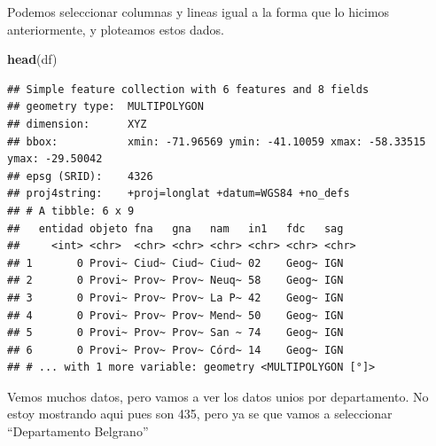 \documentclass[]{book}
\newenvironment{Shaded}{\begin{snugshade}}{\end{snugshade}}
\newcommand{\KeywordTok}[1]{\textcolor[rgb]{0.13,0.29,0.53}{\textbf{#1}}}
\newcommand{\NormalTok}[1]{#1}
\newcommand{\OperatorTok}[1]{\textcolor[rgb]{0.81,0.36,0.00}{\textbf{#1}}}
\begin{document}
Podemos seleccionar columnas y lineas igual a la forma que lo hicimos anteriormente, y ploteamos estos dados.

\begin{Shaded}
\begin{Highlighting}[]
\KeywordTok{head}\NormalTok{(df)}
\end{Highlighting}
\end{Shaded}

\begin{verbatim}
## Simple feature collection with 6 features and 8 fields
## geometry type:  MULTIPOLYGON
## dimension:      XYZ
## bbox:           xmin: -71.96569 ymin: -41.10059 xmax: -58.33515 ymax: -29.50042
## epsg (SRID):    4326
## proj4string:    +proj=longlat +datum=WGS84 +no_defs
## # A tibble: 6 x 9
##   entidad objeto fna   gna   nam   in1   fdc   sag  
##     <int> <chr>  <chr> <chr> <chr> <chr> <chr> <chr>
## 1       0 Provi~ Ciud~ Ciud~ Ciud~ 02    Geog~ IGN  
## 2       0 Provi~ Prov~ Prov~ Neuq~ 58    Geog~ IGN  
## 3       0 Provi~ Prov~ Prov~ La P~ 42    Geog~ IGN  
## 4       0 Provi~ Prov~ Prov~ Mend~ 50    Geog~ IGN  
## 5       0 Provi~ Prov~ Prov~ San ~ 74    Geog~ IGN  
## 6       0 Provi~ Prov~ Prov~ Córd~ 14    Geog~ IGN  
## # ... with 1 more variable: geometry <MULTIPOLYGON [°]>
\end{verbatim}

Vemos muchos datos, pero vamos a ver los datos unios por departamento. No estoy mostrando aqui pues son 435, pero ya se que vamos a seleccionar ``Departamento Belgrano''

\begin{Shaded}
\end{Shaded}
\end{document}
